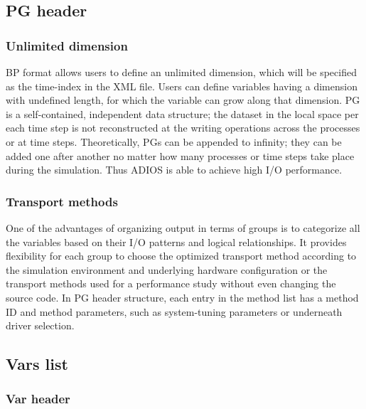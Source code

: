 \subsection{PG header}

\subsubsection{Unlimited dimension}

BP format allows users to define an unlimited dimension, which will be specified 
as the time-index in the XML file. Users can define variables having a dimension 
with undefined length, for which the variable can grow along that dimension. PG 
is a self-contained, independent data structure; the dataset in the local space 
per each time step is not reconstructed at the writing operations across the processes 
or at time steps. Theoretically, PGs can be appended to infinity; they can be added 
one after another no matter how many processes or time steps take place during 
the simulation.  Thus ADIOS is able to achieve high I/O performance.

\subsubsection{Transport methods}

One of the advantages of organizing output in terms of groups is to categorize 
all the variables based on their I/O patterns and logical relationships. It provides 
flexibility for each group to choose the optimized transport method according to 
the simulation environment and underlying hardware configuration or the transport 
methods used for a performance study without even changing the source code. In 
PG header structure, each entry in the method list has a method ID and method parameters, 
such as system-tuning parameters or underneath driver selection. 

\subsection{Vars list}

\subsubsection{Var header}

